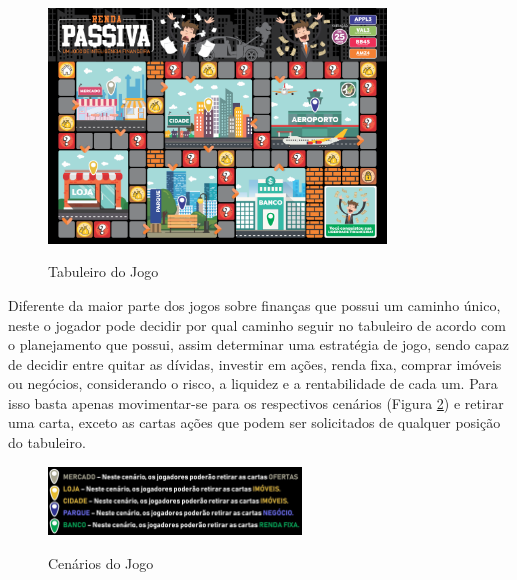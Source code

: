 \graphicspath{{figuras/}}
\begin{figure}[!ht]
\centering
\begin{minipage}{1.\textwidth}
\caption{Tabuleiro do Jogo}
\centering
\includegraphics[width=0.8\textwidth]{08-figura_tabuleiro-renda-passiva}
\label{fig: figura08}
\end{minipage}
\end{figure}

Diferente da maior parte dos jogos sobre finanças que possui um caminho único, neste o jogador pode decidir por qual caminho seguir no tabuleiro de acordo com o planejamento que possui, assim determinar uma estratégia de jogo, sendo capaz de decidir entre quitar as dívidas, investir em ações, renda fixa, comprar imóveis ou negócios, considerando o risco, a liquidez e a rentabilidade de cada um. Para isso basta apenas movimentar-se para os respectivos cenários (Figura \ref{fig: figura09}) e retirar uma carta, exceto as cartas ações que podem ser solicitados de qualquer posição do tabuleiro.

\graphicspath{{figuras/}}
\begin{figure}[!ht]
\centering
\begin{minipage}{1.\textwidth}
\caption{Cenários do Jogo}
\centering
\includegraphics[width=0.6\textwidth]{09-figura_cenario-jogo-renda-passiva}
\label{fig: figura09}
\end{minipage}
\end{figure}

